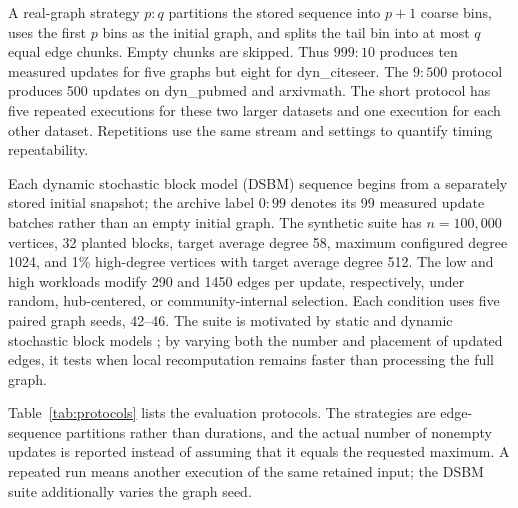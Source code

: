 \documentclass{ieeeaccess}
\begin{document}
A real-graph strategy $p{:}q$ partitions the stored sequence into $p+1$ coarse bins,
uses the first $p$ bins as the initial graph, and splits the tail bin into at
most $q$ equal edge chunks. Empty chunks are skipped. Thus $999{:}10$ produces
ten measured updates for five graphs but eight for dyn\_citeseer. The
$9{:}500$ protocol produces 500 updates on dyn\_pubmed and arxivmath. The short
protocol has five repeated executions for these two larger datasets and one
execution for each other dataset. Repetitions use the same stream and settings
to quantify timing repeatability.

Each dynamic stochastic block model (DSBM) sequence begins from a separately
stored initial snapshot; the
archive label $0{:}99$ denotes its 99 measured update batches rather than an
empty initial graph. The synthetic suite has $n=100{,}000$ vertices, 32 planted blocks, target
average degree 58, maximum configured degree 1024, and 1\% high-degree vertices
with target average degree 512. The low and high workloads modify 290 and 1450 edges per
update, respectively, under random, hub-centered, or community-internal
selection. Each condition uses five paired graph seeds, 42--46. The suite is
motivated by static and dynamic stochastic block models
\cite{Holland1983,Xu2014DSBM}; by varying both the number and placement of
updated edges, it tests when local recomputation remains faster than processing
the full graph.

Table~\ref{tab:protocols} lists the evaluation protocols. The strategies are
edge-sequence partitions rather than durations, and the actual
number of nonempty updates is reported instead of assuming that it equals the
requested maximum. A repeated run means another execution of the same retained
input; the DSBM suite additionally varies the graph seed.
\end{document}

